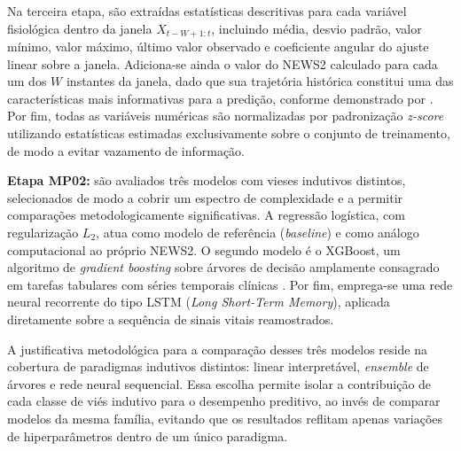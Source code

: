 Na terceira etapa, são extraídas estatísticas descritivas para cada variável fisiológica dentro da janela $X_{t-W+1:t}$, incluindo média, desvio padrão, valor mínimo, valor máximo, último valor observado e coeficiente angular do ajuste linear sobre a janela. Adiciona-se ainda o valor do NEWS2 calculado para cada um dos $W$ instantes da janela, dado que sua trajetória histórica constitui uma das características mais informativas para a predição, conforme demonstrado por . Por fim, todas as variáveis numéricas são normalizadas por padronização \textit{z-score} utilizando estatísticas estimadas exclusivamente sobre o conjunto de treinamento, de modo a evitar vazamento de informação.

\textbf{Etapa MP02:} são avaliados três modelos com vieses indutivos distintos, selecionados de modo a cobrir um espectro de complexidade e a permitir comparações metodologicamente significativas. A regressão logística, com regularização $L_{2}$, atua como modelo de referência (\textit{baseline}) e como análogo computacional ao próprio NEWS2. O segundo modelo é o XGBoost, um algoritmo de \textit{gradient boosting} sobre árvores de decisão amplamente consagrado em tarefas tabulares com séries temporais clínicas \cite{churpek2016}. Por fim, emprega-se uma rede neural recorrente do tipo LSTM (\textit{Long Short-Term Memory}), aplicada diretamente sobre a sequência de sinais vitais reamostrados. %

A justificativa metodológica para a comparação desses três modelos reside na cobertura de paradigmas indutivos distintos: linear interpretável, \textit{ensemble} de árvores e rede neural sequencial. Essa escolha permite isolar a contribuição de cada classe de viés indutivo para o desempenho preditivo, ao invés de comparar modelos da mesma família, evitando que os resultados reflitam apenas variações de hiperparâmetros dentro de um único paradigma.
